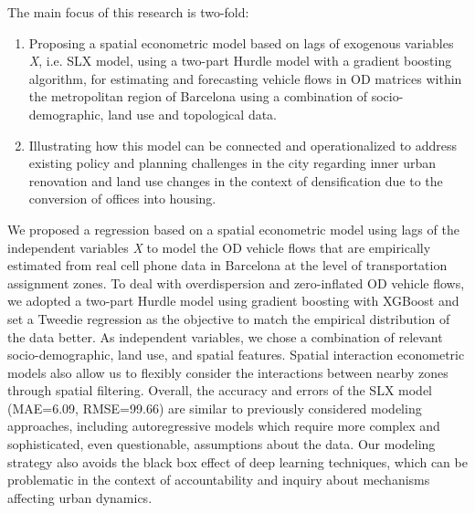 The main focus of this research is two-fold: 
\begin{enumerate}
    \item Proposing a spatial econometric model based on lags of exogenous variables \emph{X}, i.e. SLX model, using a two-part Hurdle model with a gradient boosting algorithm, for estimating and forecasting vehicle flows in OD matrices within the metropolitan region of Barcelona using a combination of socio-demographic, land use and topological data.
    \item Illustrating how this model can be connected and operationalized to address existing policy and planning challenges in the city regarding inner urban renovation and land use changes in the context of densification due to the conversion of offices into housing.
\end{enumerate}

We proposed a regression based on a spatial econometric model using lags of the independent variables \emph{X} to model the OD vehicle flows that are empirically estimated from real cell phone data in Barcelona at the level of transportation assignment zones. To deal with overdispersion and zero-inflated OD vehicle flows, we adopted a two-part Hurdle model using gradient boosting with XGBoost and set a Tweedie regression as the objective to match the empirical distribution of the data better. As independent variables, we chose a combination of relevant socio-demographic, land use, and spatial features. Spatial interaction econometric models also allow us to flexibly consider the interactions between nearby zones through spatial filtering. Overall, the accuracy and errors of the SLX model  (MAE=6.09, RMSE=99.66) are similar to previously considered modeling approaches, including autoregressive models which require more complex and sophisticated, even questionable, assumptions about the data. Our modeling strategy also avoids the black box effect of deep learning techniques, which can be problematic in the context of accountability and inquiry about mechanisms affecting urban dynamics.

